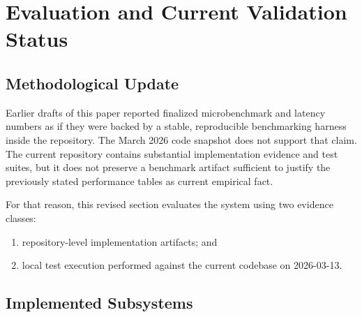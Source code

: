 \section{Evaluation and Current Validation Status}

\subsection{Methodological Update}

Earlier drafts of this paper reported finalized microbenchmark and latency numbers as if they were backed by a stable, reproducible benchmarking harness inside the repository. The March 2026 code snapshot does not support that claim. The current repository contains substantial implementation evidence and test suites, but it does not preserve a benchmark artifact sufficient to justify the previously stated performance tables as current empirical fact.

For that reason, this revised section evaluates the system using two evidence classes:
\begin{enumerate}
    \item repository-level implementation artifacts; and
    \item local test execution performed against the current codebase on 2026-03-13.
\end{enumerate}

\subsection{Implemented Subsystems}

